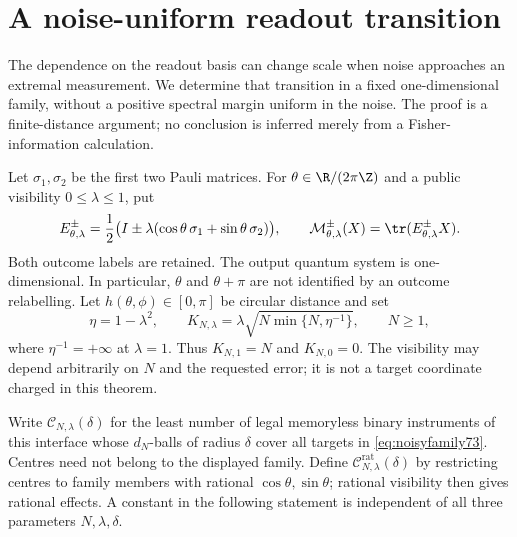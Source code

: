 \section{A noise-uniform readout transition}\label{sec:noisyreadout73}
The dependence on the readout basis can change scale when noise approaches
an extremal measurement. We determine that transition in a fixed
one-dimensional family, without a positive spectral margin uniform in
the noise. The proof is a finite-distance argument; no conclusion is
inferred merely from a Fisher-information calculation.

Let $\sigma_1,\sigma_2$ be the first two Pauli matrices. For
$\theta\in\R/(2\pi\Z)$ and a public visibility $0\le\lambda\le1$, put
\begin{equation}\label{eq:noisyfamily73}
 E_{\theta,\lambda}^{\pm}
 =\frac12\bigl(I\pm\lambda(\cos\theta\,\sigma_1+
                                  \sin\theta\,\sigma_2)\bigr),\qquad
 \mathcal M_{\theta,\lambda}^{\pm}(X)=\tr(E_{\theta,\lambda}^{\pm}X).
\end{equation}
Both outcome labels are retained. The output quantum system is
one-dimensional. In particular, $\theta$ and $\theta+\pi$ are not
identified by an outcome relabelling. Let $h(\theta,\phi)\in[0,\pi]$
be circular distance and set
\begin{equation}\label{eq:noisyscale73}
 \eta=1-\lambda^2,\qquad
 K_{N,\lambda}=\lambda\sqrt{N\min\{N,\eta^{-1}\}},\qquad N\ge1,
\end{equation}
where $\eta^{-1}=+\infty$ at $\lambda=1$. Thus $K_{N,1}=N$ and
$K_{N,0}=0$. The visibility may depend arbitrarily on $N$ and the
requested error; it is not a target coordinate charged in this theorem.

Write $\mathcal C_{N,\lambda}(\delta)$ for the least number of legal
memoryless binary instruments of this interface whose $d_N$-balls of
radius $\delta$ cover all targets in \eqref{eq:noisyfamily73}.
Centres need not belong to the displayed family. Define
$\mathcal C^{\mathrm{rat}}_{N,\lambda}(\delta)$ by restricting centres
to family members with rational $\cos\theta,\sin\theta$; rational
visibility then gives rational effects. A constant in the following
statement is independent of all three parameters $N,\lambda,\delta$.

